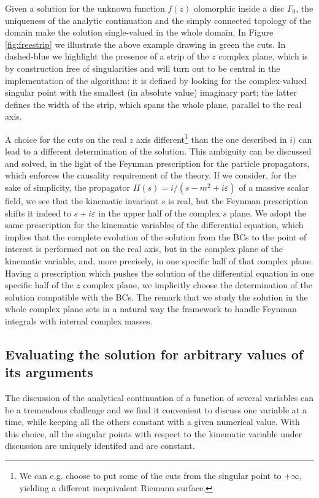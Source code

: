 Given a solution for the unknown function $f(z)$ olomorphic inside a disc
$\Gamma_0$,
the uniqueness of the analytic continuation 
and the simply connected topology of the domain
make the solution single-valued in the whole domain.
In Figure \ref{fig:freestrip} we illustrate the above example
drawing in green the cuts.
In dashed-blue we highlight the presence of a strip of the $z$ complex plane,
which is by construction free of singularities
and will turn out to be central in the implementation of the algorithm:
it is defined by looking for the complex-valued singular point
with the smallest (in absolute value) imaginary part;
the latter defines the width of the strip,
which spans the whole plane, parallel to the real axis.


A choice for the cuts on the real $z$ axis different\footnote{
  We can e.g. choose to put some of the cuts from the singular point to
  $+\infty$, yielding a different inequivalent Riemann surface.
  }
than the one described in $i)$
can lead to a different determination of the solution.
This ambiguity can be discussed and solved,
in the light of the Feynman prescription for the particle propagators,
which enforces the causality requirement of the theory.
If we consider, for the sake of simplicity,
the propagator $\Pi(s)=i/(s-m^2+i\varepsilon)$ of a massive scalar field,
we see that the kinematic invariant $s$ is real,
but the Feynman prescription shifts it indeed to $s+i\varepsilon$
in the upper half of the complex $s$ plane.
We adopt the same prescription for the kinematic variables
of the differential equation,
which implies that
the complete evolution of the solution from the BCs to the point of interest
is performed not on the real axis,
but in the complex plane of the kinematic variable,
and, more precisely, in one specific half of that complex plane.
Having a prescription which pushes the solution of the differential equation
in one specific half of the $z$ complex plane,
we implicitly choose the determination of the solution compatible
with the BCs.
The remark that we study the solution in the whole complex plane
sets in a natural way the framework to handle Feynman integrals
with internal complex masses.


\subsection{Evaluating the solution for arbitrary values of its arguments}
\label{sec:continuation}
The discussion of
the analytical continuation of a function of several variables
can be a tremendous challenge and
we find it convenient to discuss one variable at a time,
while keeping all the others constant with a given numerical value.
With this choice,
all the singular points with respect to the kinematic variable under discussion
are uniquely identifed and are constant.

